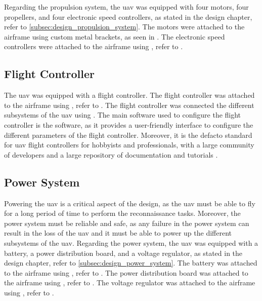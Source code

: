 Regarding the propulsion system, the \gls{uav} was equipped with four  motors, four  propellers, and four  electronic speed controllers, as stated in the design chapter, refer to \cref{subsec:design_propulsion_system}. The motors were attached to the airframe using custom metal brackets, as seen in . The electronic speed controllers were attached to the airframe using , refer to .



\subsection{Flight Controller}\label{subsec:implementation_flight_controller}

The \gls{uav} was equipped with a  flight controller. The flight controller was attached to the airframe using , refer to . The flight controller was connected the different subsystems of the \gls{uav} using . The main software used to configure the flight controller is the  software, as it provides a user-friendly interface to configure the different parameters of the flight controller. Moreover, it is the defacto standard for \gls{uav} flight controllers for hobbyists and professionals, with a large community of developers  and a large repository of documentation and tutorials .


\subsection{Power System}\label{subsec:implementation_power_system}

Powering the \gls{uav} is a critical aspect of the design, as the \gls{uav} must be able to fly for a long period of time to perform the reconnaissance tasks. Moreover, the power system must be reliable and safe, as any failure in the power system can result in the loss of the \gls{uav} and it must be able to power up the different subsystems of the \gls{uav}. Regarding the power system, the \gls{uav} was equipped with a  battery, a  power distribution board, and a  voltage regulator, as stated in the design chapter, refer to \cref{subsec:design_power_system}. The battery was attached to the airframe using , refer to . The power distribution board was attached to the airframe using , refer to . The voltage regulator was attached to the airframe using , refer to .

